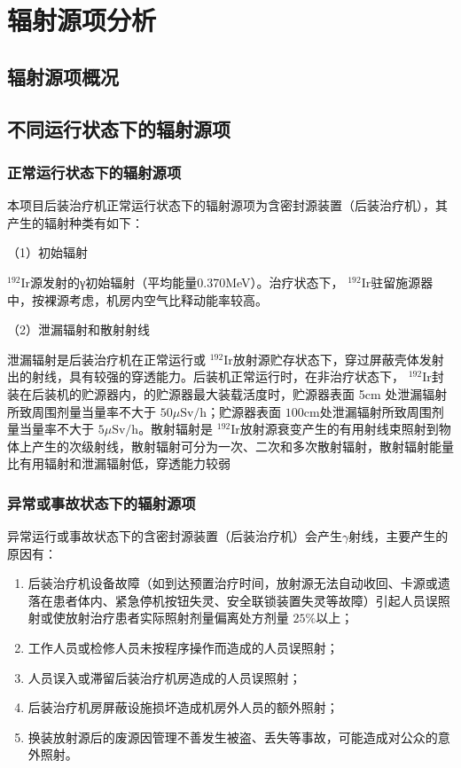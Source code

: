 \chapter{辐射源项分析}

\section{辐射源项概况}



\section{不同运行状态下的辐射源项}

\subsection{正常运行状态下的辐射源项}

本项目后装治疗机正常运行状态下的辐射源项为含密封源装置（后装治疗机），其产生的辐射种类有如下：

（1）初始辐射

$^ { 1 9 2 } \mathrm { I r }$源发射的γ初始辐射（平均能量0.370MeV）。治疗状态下， $^ { 1 9 2 } \mathrm { I r }$驻留施源器中，按裸源考虑，机房内空气比释动能率较高。

（2）泄漏辐射和散射射线

泄漏辐射是后装治疗机在正常运行或 $^ { 1 9 2 } \mathrm { I r }$放射源贮存状态下，穿过屏蔽壳体发射出的射线，具有较强的穿透能力。后装机正常运行时，在非治疗状态下， $^ { 1 9 2 } \mathrm { I r }$封装在后装机的贮源器内，的贮源器最大装载活度时，贮源器表面 5cm 处泄漏辐射所致周围剂量当量率不大于 $5 0 \mu \mathrm { S v / h }$；贮源器表面 $1 0 0 \mathrm { c m }$处泄漏辐射所致周围剂量当量率不大于 $5 \mu \mathrm { S v / h }$。散射辐射是 $^ { 1 9 2 } \mathrm { I r }$放射源衰变产生的有用射线束照射到物体上产生的次级射线，散射辐射可分为一次、二次和多次散射辐射，散射辐射能量比有用辐射和泄漏辐射低，穿透能力较弱

\subsection{异常或事故状态下的辐射源项}

异常运行或事故状态下的含密封源装置（后装治疗机）会产生$\gamma$射线，主要产生的原因有：

\begin{enumerate}
\item 后装治疗机设备故障（如到达预置治疗时间，放射源无法自动收回、卡源或遗落在患者体内、紧急停机按钮失灵、安全联锁装置失灵等故障）引起人员误照射或使放射治疗患者实际照射剂量偏离处方剂量 $2 5 \%$以上；
\item 工作人员或检修人员未按程序操作而造成的人员误照射；
\item 人员误入或滞留后装治疗机房造成的人员误照射；
\item 后装治疗机房屏蔽设施损坏造成机房外人员的额外照射；
\item 换装放射源后的废源因管理不善发生被盗、丢失等事故，可能造成对公众的意外照射。
\end{enumerate}

